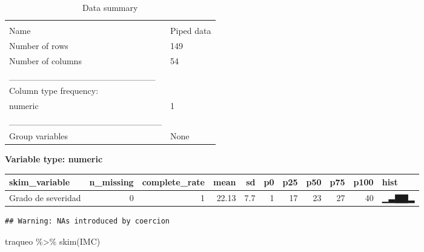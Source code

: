 \documentclass[
]{article}
\newenvironment{Shaded}{\begin{snugshade}}{\end{snugshade}}
\newcommand{\DocumentationTok}[1]{\textcolor[rgb]{0.56,0.35,0.01}{\textbf{\textit{#1}}}}
\newcommand{\FunctionTok}[1]{\textcolor[rgb]{0.00,0.00,0.00}{#1}}
\newcommand{\NormalTok}[1]{#1}
\newcommand{\OtherTok}[1]{\textcolor[rgb]{0.56,0.35,0.01}{#1}}
\newcommand{\SpecialCharTok}[1]{\textcolor[rgb]{0.00,0.00,0.00}{#1}}
\begin{document}
\begin{longtable}[]{@{}ll@{}}
\caption{Data summary}\tabularnewline
\toprule
& \\
\midrule
\endfirsthead
\toprule
& \\
\midrule
\endhead
Name & Piped data \\
Number of rows & 149 \\
Number of columns & 54 \\
\_\_\_\_\_\_\_\_\_\_\_\_\_\_\_\_\_\_\_\_\_\_\_ & \\
Column type frequency: & \\
numeric & 1 \\
\_\_\_\_\_\_\_\_\_\_\_\_\_\_\_\_\_\_\_\_\_\_\_\_ & \\
Group variables & None \\
\bottomrule
\end{longtable}

\textbf{Variable type: numeric}

\begin{longtable}[]{@{}lrrrrrrrrrl@{}}
\toprule
skim\_variable & n\_missing & complete\_rate & mean & sd & p0 & p25 &
p50 & p75 & p100 & hist \\
\midrule
\endhead
Grado de severidad & 0 & 1 & 22.13 & 7.7 & 1 & 17 & 23 & 27 & 40 &
▁▃▇▇▂ \\
\bottomrule
\end{longtable}

\begin{Shaded}
\end{Shaded}

\begin{verbatim}
## Warning: NAs introduced by coercion
\end{verbatim}

\begin{Shaded}
\begin{Highlighting}[]
\NormalTok{traqueo }\SpecialCharTok{\%\textgreater{}\%}
  \FunctionTok{skim}\NormalTok{(IMC)}
\end{Highlighting}
\end{Shaded}
\end{document}
